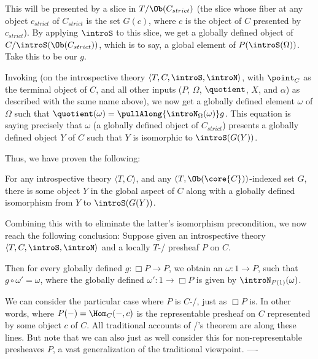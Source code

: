 This will be presented by a slice in $T/\Ob(C_{strict})$ (the slice whose fiber at any object $c_{strict}$ of $C_{strict}$ is the set $G(c)$, where $c$ is the object of $C$ presented by $c_{strict}$). By applying $\introS$ to this slice, we get a globally defined object of $C/\introS(\Ob(C_{strict}))$, which is to say, a global element of $P(\introS(\Omega))$. Take this to be our $g$.

Invoking  (on the introspective theory $\langle T, C, \introS, \introN \rangle$, with $\point_C$ as the terminal object of $C$, and all other inputs ($P$, $\Omega$, $\quotient$, $X$, and $\alpha$) as described with the same name above), we now get a globally defined element $\omega$ of $\Omega$ such that $\quotient(\omega) = \pullAlong{\introN_{\Omega}(\omega)} g$. This equation is saying precisely that $\omega$ (a globally defined object of $C_{strict}$) presents a globally defined object $Y$ of $C$ such that $Y$ is isomorphic to $\introS(G(Y))$.

Thus, we have proven the following:
\begin{theorem}\label{IntrospTyConFixedPoints}
For any introspective theory $\langle T, C \rangle$, and any  $(T, \Ob(\core{C}))$-indexed set $G$, there is some object $Y$ in the global aspect of $C$ along with a globally defined isomorphism from $Y$ to $\introS(G(Y))$.
\end{theorem}

Combining this with  to eliminate the latter's isomorphism precondition, we now reach the following conclusion:
\label{IntrospLoeb}
Suppose given an introspective theory $\langle T, C, \introS, \introN \rangle$ and a locally $T$-\repsmall/ presheaf $P$  on $C$.

Then for every globally defined $g : \Box P \to P$, we obtain an $\omega : 1 \to P$, such that $g \circ \omega' = \omega$, where the globally defined $\omega' : 1 \to \Box P$ is given by $\introN_{P(1)}(\omega)$. 

We can consider the particular case where $P$ is $C$-\repsmall/, just as $\Box P$ is. In other words, where $P(-) = \Hom_C(-, c)$ is the representable presheaf on $C$ represented by some object $c$ of $C$. All traditional accounts of \Loeb/'s theorem are along these lines. But note that we can also just as well consider this  for non-representable presheaves $P$, a vast generalization of the traditional viewpoint.
----

